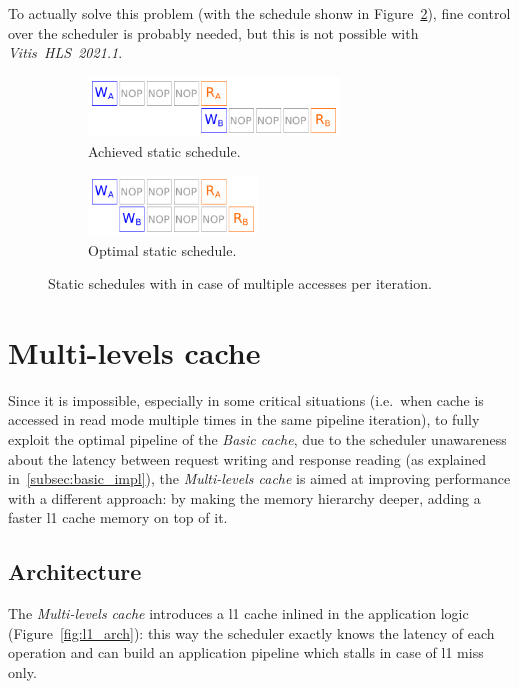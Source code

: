 \documentclass[11pt,a4paper,oneside]{memoir}
\begin{document}
\bigskip
To actually solve this problem (with the schedule shonw in
Figure~\ref{subfig:fixed_sched_desired}), fine control over the scheduler is
probably needed, but this is not possible with
\emph{Vitis\texttrademark~HLS~2021.1}.

\begin{figure}[!htb]
	\centering
	\begin{subfigure}[b]{.4\textwidth}
		\centering
		\includegraphics[height=1.6cm]{fixed_schedule_issue}
		\caption{Achieved static schedule.}
		\label{subfig:fixed_sched_issue}
	\end{subfigure}
	\hfill
	\begin{subfigure}[b]{.4\textwidth}
		\centering
		\includegraphics[height=1.6cm]{fixed_schedule_desired}
		\caption{Optimal static schedule.}
		\label{subfig:fixed_sched_desired}
	\end{subfigure}
	\caption{Static schedules with in case of multiple accesses per
	iteration.}
	\label{fig:fixed_sched_issue}
\end{figure}

\clearpage

\section{Multi-levels cache}
Since it is impossible, especially in some critical situations (i.e.\ when
cache is accessed in read mode multiple times in the same pipeline iteration),
to fully exploit the optimal pipeline of the \emph{Basic cache}, due to the
scheduler unawareness about the latency between request writing and response
reading (as explained in~\ref{subsec:basic_impl}), the \emph{Multi-levels
cache} is aimed at improving performance with a different approach: by making
the memory hierarchy deeper, adding a faster \ac{l1} cache memory on top of it.

\subsection{Architecture}
The \emph{Multi-levels cache} introduces a \ac{l1} cache inlined in the
application logic (Figure~\ref{fig:l1_arch}): this way the scheduler exactly
knows the latency of each operation and can build an application pipeline which
stalls in case of \ac{l1} miss only.
\end{document}
